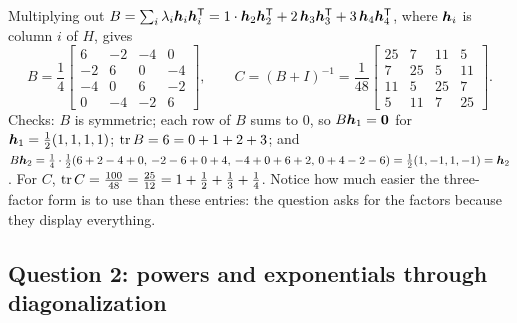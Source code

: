 \begin{example}\label{ex:u38-B}
Multiplying out $B=\sum_i\lambda_i\boldsymbol{h}_i\boldsymbol{h}_i^{\mathsf{T}}=1\cdot\boldsymbol{h}_2\boldsymbol{h}_2^{\mathsf{T}}+2\,\boldsymbol{h}_3\boldsymbol{h}_3^{\mathsf{T}}+3\,\boldsymbol{h}_4\boldsymbol{h}_4^{\mathsf{T}}$, where $\boldsymbol{h}_i$ is column $i$ of $H$, gives
\[
B=\frac14\begin{bmatrix}6&-2&-4&0\\-2&6&0&-4\\-4&0&6&-2\\0&-4&-2&6\end{bmatrix},\qquad
C=(B+I)^{-1}=\frac{1}{48}\begin{bmatrix}25&7&11&5\\7&25&5&11\\11&5&25&7\\5&11&7&25\end{bmatrix}.
\]
Checks: $B$ is symmetric; each row of $B$ sums to $0$, so $B\boldsymbol{h}_1=\boldsymbol{0}$ for $\boldsymbol{h}_1=\tfrac12(1,1,1,1)$; $\operatorname{tr} B=6=0+1+2+3$; and $B\boldsymbol{h}_2=\tfrac14\cdot\tfrac12(6+2-4+0,\,-2-6+0+4,\,-4+0+6+2,\,0+4-2-6)=\tfrac12(1,-1,1,-1)=\boldsymbol{h}_2$. For $C$, $\operatorname{tr} C=\tfrac{100}{48}=\tfrac{25}{12}=1+\tfrac12+\tfrac13+\tfrac14$. Notice how much easier the three-factor form is to use than these entries: the question asks for the factors because they display everything.
\end{example}

\subsection{Question 2: powers and exponentials through diagonalization}

